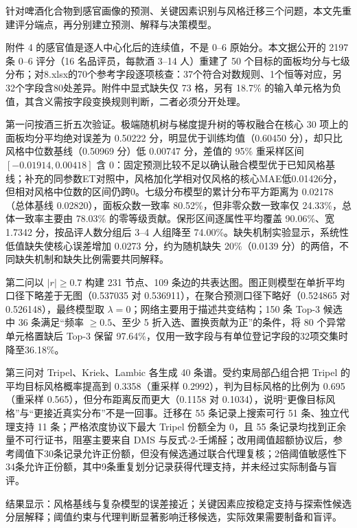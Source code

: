 针对啤酒化合物到感官画像的预测、关键因素识别与风格迁移三个问题，本文先重建评分端点，再分别建立预测、解释与决策模型。
\par
附件 4 的感官值是逐人中心化后的连续值，不是 0--6 原始分。本文据公开的 2197 条 0--6 评分（16 名品评员，每款酒 3--14 人）重建了 50 个目标的面板均分与七级分布；对8.xlsx的70个参考字段逐项核查：37个符合对数规则、1个恒等对应，另32个字段含80处差异。附件中显式缺失仅 73 格，另有 18.7\% 的输入单元格为负值，其含义需按字段变换规则判断，二者必须分开处理。
\par
第一问按酒三折五次验证。极端随机树与梯度提升树的等权融合在核心 30 项上的面板均分平均绝对误差为 0.50222 分，明显优于训练均值（0.60450 分），却只比风格中位数基线（0.50969 分）低 0.00747 分，差值的 95\% 重采样区间 $[-0.01914,0.00418]$ 含 0：固定预测比较不足以确认融合模型优于已知风格基线；补充的同参数ET对照中，风格加化学相对仅风格的核心MAE低0.01426分，但相对风格中位数的区间仍跨0。七级分布模型的累计分布平方距离为 0.02178（总体基线 0.02820），面板众数一致率 80.52\%，但非零众数一致率仅 24.33\%，总体一致率主要由 78.03\% 的零等级贡献。保形区间逐属性平均覆盖 90.06\%、宽 1.7342 分，按品评人数分组后 3--4 人组降至 74.00\%。缺失机制实验显示，系统性低值缺失使核心误差增加 0.0273 分，约为随机缺失 20\%（0.0139 分）的两倍，不同缺失机制和缺失比例需要共同解释。
\par
第二问以 $|r|\ge0.7$ 构建 231 节点、109 条边的共表达图。图正则模型在单折平均口径下略差于无图（0.537035 对 0.536911），在聚合预测口径下略好（0.524865 对 0.526148），最终模型取 $\lambda=0$；网络主要用于描述共变结构；150 条 Top-3 候选中 36 条满足“频率 $\ge0.5$、至少 5 折入选、置换贡献为正”的条件，将 80 个异常单元格置缺后 Top-3 保留 97.64\%，仅用一致字段与有单位登记字段的32项交集时降至36.18\%。
\par
第三问对 Tripel、Kriek、Lambic 各生成 40 条谱。受约束局部凸组合把 Tripel 的平均目标风格概率提高到 0.3358（重采样 0.2992），判为目标风格的比例为 0.695（重采样 0.565），但分布距离反而更大（0.1158 对 0.1034），说明“更像目标风格”与“更接近真实分布”不是一回事。迁移在 55 条记录上搜索可行 51 条、独立代理支持 11 条；严格浓度协议下最大 Tripel 份额全为 0，且 55 条记录均找到正余量不可行证书，阻塞主要来自 DMS 与反式-2-壬烯醛；改用阈值超额协议后，参考阈值下30条记录允许正份额，但没有候选通过联合代理复核；2倍阈值敏感性下34条允许正份额，其中9条重复划分记录获得代理支持，并未经过实际制备与盲评。
\par
结果显示：风格基线与复杂模型的误差接近；关键因素应按稳定支持与探索性候选分层解释；阈值约束与代理判断显著影响迁移候选，实际效果需要制备和盲评。
